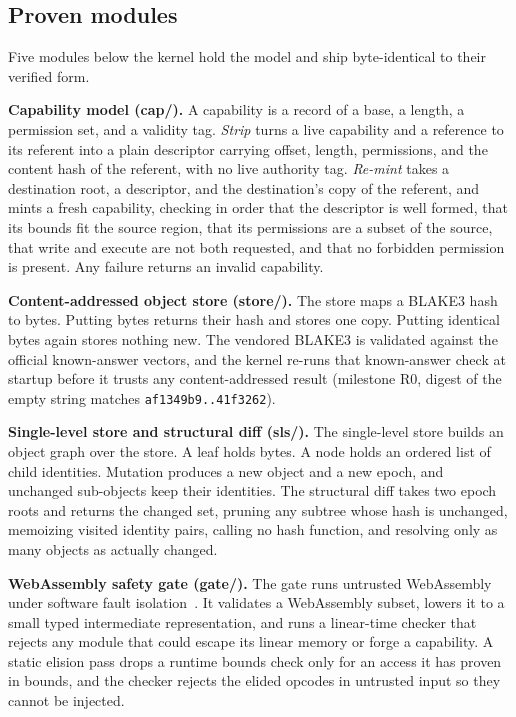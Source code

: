 \documentclass[10pt,twocolumn]{article}
\begin{document}
\subsection{Proven modules}

Five modules below the kernel hold the model and ship byte-identical to their
verified form.

\textbf{Capability model (cap/).} A capability is a record of a base, a length, a
permission set, and a validity tag. \emph{Strip} turns a live capability and a
reference to its referent into a plain descriptor carrying offset, length,
permissions, and the content hash of the referent, with no live authority tag.
\emph{Re-mint} takes a destination root, a descriptor, and the destination's copy
of the referent, and mints a fresh capability, checking in order that the
descriptor is well formed, that its bounds fit the source region, that its
permissions are a subset of the source, that write and execute are not both
requested, and that no forbidden permission is present. Any failure returns an
invalid capability.

\textbf{Content-addressed object store (store/).} The store maps a BLAKE3 hash to
bytes. Putting bytes returns their hash and stores one copy. Putting identical
bytes again stores nothing new. The vendored BLAKE3 is validated against the
official known-answer vectors, and the kernel re-runs that known-answer check at
startup before it trusts any content-addressed result (milestone R0, digest of
the empty string matches \texttt{af1349b9..41f3262}).

\textbf{Single-level store and structural diff (sls/).} The single-level store
builds an object graph over the store. A leaf holds bytes. A node holds an ordered
list of child identities. Mutation produces a new object and a new epoch, and
unchanged sub-objects keep their identities. The structural diff takes two epoch
roots and returns the changed set, pruning any subtree whose hash is unchanged,
memoizing visited identity pairs, calling no hash function, and resolving only as
many objects as actually changed.

\textbf{WebAssembly safety gate (gate/).} The gate runs untrusted WebAssembly
under software fault isolation~\cite{wahbe1993sfi,haas2017wasm}. It validates a
WebAssembly subset, lowers it to a small typed intermediate representation, and
runs a linear-time checker that rejects any module that could escape its linear
memory or forge a capability. A static elision pass drops a runtime bounds check
only for an access it has proven in bounds, and the checker rejects the elided
opcodes in untrusted input so they cannot be injected.
\end{document}

